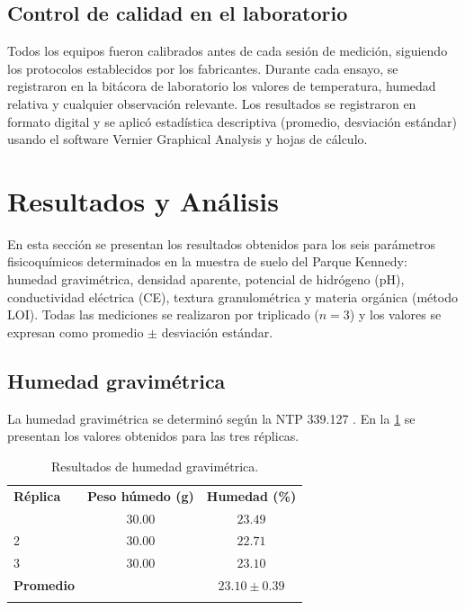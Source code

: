 \documentclass[fleqn]{jaes}
\begin{document}
\subsection{Control de calidad en el laboratorio}

Todos los equipos fueron calibrados antes de cada sesión de medición, siguiendo los protocolos establecidos por los fabricantes. Durante cada ensayo, se registraron en la bitácora de laboratorio los valores de temperatura, humedad relativa y cualquier observación relevante. Los resultados se registraron en formato digital y se aplicó estadística descriptiva (promedio, desviación estándar) usando el software Vernier Graphical Analysis y hojas de cálculo.

\section{Resultados y Análisis}\label{sec:resultados}

En esta sección se presentan los resultados obtenidos para los seis parámetros fisicoquímicos determinados en la muestra de suelo del Parque Kennedy: humedad gravimétrica, densidad aparente, potencial de hidrógeno (pH), conductividad eléctrica (CE), textura granulométrica y materia orgánica (método LOI). Todas las mediciones se realizaron por triplicado ($n=3$) y los valores se expresan como promedio $\pm$ desviación estándar.

\subsection{Humedad gravimétrica}\label{subsec:humedad}

La humedad gravimétrica se determinó según la NTP 339.127 \cite{INACAL2019}. En la \cref{tab:humedad} se presentan los valores obtenidos para las tres réplicas.

\begin{table}[!ht]
\centering
\small
\caption{Resultados de humedad gravimétrica.}\label{tab:humedad}
\begin{tabular}{@{}lcc@{}}
\toprule
\textbf{Réplica} & \textbf{Peso húmedo (g)} & \textbf{Humedad (\%)} \\
\colrule
1 & $30.00$ & $23.49$ \\
2 & $30.00$ & $22.71$ \\
3 & $30.00$ & $23.10$ \\
\colrule
\textbf{Promedio} & & $23.10 \pm 0.39$ \\
\botrule
\end{tabular}
\end{table}
\end{document}
